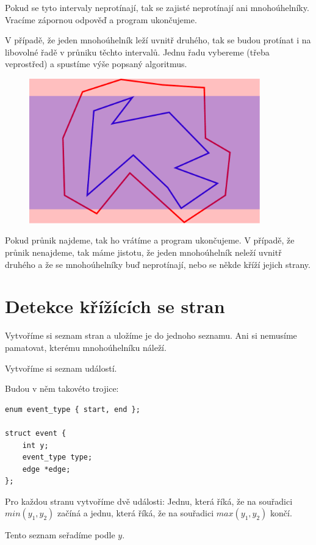 \documentclass{article}
\begin{document}
Pokud se tyto intervaly neprotínají, tak se zajisté neprotínají ani mnohoúhelníky. Vracíme zápornou odpověď a program ukončujeme.

V případě, že jeden mnohoúhelník leží uvnitř druhého, tak se budou protínat i na libovolné řadě v průniku těchto intervalů. Jednu řadu vybereme (třeba veprostřed) a spustíme výše popsaný algoritmus.

\begin{figure}[h] \centering
    \includegraphics[width=10cm]{images/inside.pdf}
\end{figure}

Pokud průnik najdeme, tak ho vrátíme a program ukončujeme. V případě, že průnik nenajdeme, tak máme jistotu, že jeden mnohoúhelník neleží uvnitř druhého a že se mnohoúhelníky buď neprotínají, nebo se někde kříží jejich strany.

\section*{Detekce křížících se stran}

Vytvoříme si seznam stran a uložíme je do jednoho seznamu. Ani si nemusíme pamatovat, kterému mnohoúhelníku náleží.

Vytvoříme si seznam událostí.

Budou v něm takovéto trojice:

\begin{verbatim}
enum event_type { start, end };

struct event {
    int y;
    event_type type;
    edge *edge;
};
\end{verbatim}

Pro každou stranu vytvoříme dvě události: Jednu, která říká, že na souřadici \(min(y_1, y_2)\) začíná a jednu, která říká, že na souřadici \(max(y_1, y_2)\) končí.

Tento seznam seřadíme podle \(y\).
\end{document}
